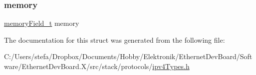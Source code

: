 \mbox{\label{structipv4__packet_ad8f3b87ff206655025f5734f21bce6e7}} 
\subsubsection{\texorpdfstring{memory}{memory}}
{\footnotesize\ttfamily \mbox{\hyperlink{group__memory_ga1d04d80fae40964f55d2df46b5d64785}{memory\+Field\+\_\+t}} memory}



The documentation for this struct was generated from the following file\+:\begin{DoxyCompactItemize}
\item 
C\+:/\+Users/stefa/\+Dropbox/\+Documents/\+Hobby/\+Elektronik/\+Ethernet\+Dev\+Board/\+Software/\+Ethernet\+Dev\+Board.\+X/src/stack/protocols/\mbox{\hyperlink{ipv4_types_8h}{ipv4\+Types.\+h}}\end{DoxyCompactItemize}
